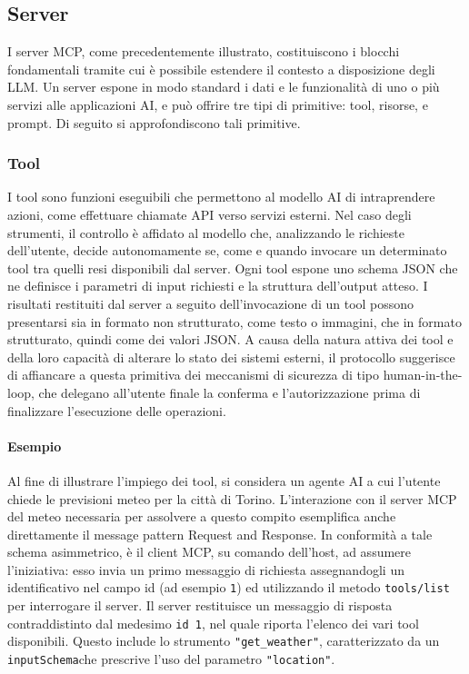 \subsection{Server}\label{server}

I server MCP, come precedentemente illustrato, costituiscono i blocchi
fondamentali tramite cui è possibile estendere il contesto a
disposizione degli LLM. Un server espone in modo standard i dati e le
funzionalità di uno o più servizi alle applicazioni AI, e può offrire
tre tipi di primitive: tool, risorse, e prompt. Di seguito si
approfondiscono tali primitive.

\subsubsection{Tool}\label{tool}

I tool sono funzioni eseguibili che permettono al modello AI di
intraprendere azioni, come effettuare chiamate API verso servizi
esterni. Nel caso degli strumenti, il controllo è affidato al modello
che, analizzando le richieste dell'utente, decide autonomamente se, come
e quando invocare un determinato tool tra quelli resi disponibili dal
server. Ogni tool espone uno schema JSON che ne definisce i parametri di
input richiesti e la struttura dell'output atteso. I risultati
restituiti dal server a seguito dell'invocazione di un tool possono
presentarsi sia in formato non strutturato, come testo o immagini, che
in formato strutturato, quindi come dei valori JSON. A causa della
natura attiva dei tool e della loro capacità di alterare lo stato dei
sistemi esterni, il protocollo suggerisce di affiancare a questa
primitiva dei meccanismi di sicurezza di tipo human-in-the-loop, che
delegano all'utente finale la conferma e l'autorizzazione prima di
finalizzare l'esecuzione delle operazioni.

\paragraph{Esempio}\label{esempio-tool}

Al fine di illustrare l'impiego dei tool, si considera un agente AI a
cui l'utente chiede le previsioni meteo per la città di Torino.
L'interazione con il server MCP del meteo necessaria per assolvere a
questo compito esemplifica anche direttamente il message pattern Request
and Response. In conformità a tale schema asimmetrico, è il client MCP,
su comando dell'host, ad assumere l'iniziativa: esso invia un primo
messaggio di richiesta assegnandogli un identificativo nel campo id (ad
esempio \texttt{1}) ed utilizzando il metodo \texttt{tools/list} per interrogare il
server. Il server restituisce un messaggio di risposta contraddistinto
dal medesimo \texttt{id 1}, nel quale riporta l'elenco dei vari tool disponibili.
Questo include lo strumento \texttt{"get\_weather"}, caratterizzato da un
\texttt{inputSchema}che prescrive l'uso del parametro \texttt{"location"}.


